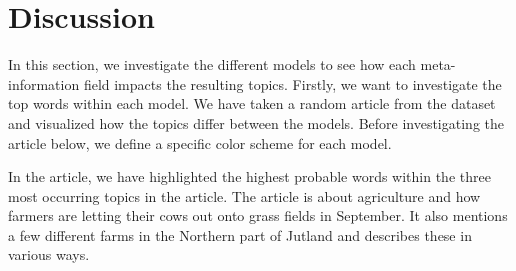 \section{Discussion}\label{sec:discussion}
In this section, we investigate the different models to see how each meta-information field impacts the resulting topics.
Firstly, we want to investigate the top words within each model.
We have taken a random article from the dataset and visualized how the topics differ between the models. 
Before investigating the article below, we define a specific color scheme for each model.

In the article, we have highlighted the highest probable words within the three most occurring topics in the article.
The article is about agriculture and how farmers are letting their cows out onto grass fields in September. 
It also mentions a few different farms in the Northern part of Jutland and describes these in various ways.

